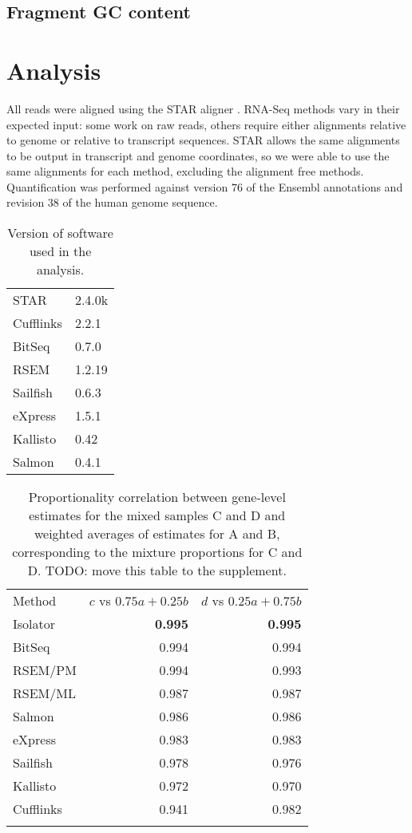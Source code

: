\documentclass{article}
\begin{document}
\subsection{Fragment GC content}\label{fragment-gc-content}

\section{Analysis}

All reads were aligned using the STAR aligner \cite{Dobin:2013fg}. RNA-Seq
methods vary in their expected input: some work on raw reads, others require
either alignments relative to genome or relative to transcript sequences. STAR
allows the same alignments to be output in transcript and genome coordinates, so
we were able to use the same alignments for each method, excluding the alignment
free methods. Quantification was performed against version 76 of the Ensembl
annotations and revision 38 of the human genome sequence.

\begin{table}
\begin{tabular}[c]{ll}
    STAR & 2.4.0k \\
    Cufflinks & 2.2.1 \\
    BitSeq & 0.7.0 \\
    RSEM & 1.2.19 \\
    Sailfish & 0.6.3 \\
    eXpress & 1.5.1 \\
    Kallisto & 0.42 \\
    Salmon & 0.4.1
\end{tabular}
\caption{
    Version of software used in the analysis.
}
\end{table}

\begin{table}\begin{tabular}[c]{@{}lrr@{}}
\toprule\addlinespace
Method & $c$ vs $0.75a + 0.25b$ & $d$ vs $0.25a + 0.75b$
\\\addlinespace
\midrule
Isolator & \textbf{0.995} & \textbf{0.995}
\\\addlinespace
BitSeq & 0.994 & 0.994
\\\addlinespace
RSEM/PM & 0.994 & 0.993
\\\addlinespace
RSEM/ML & 0.987 & 0.987
\\\addlinespace
Salmon & 0.986 & 0.986
\\\addlinespace
eXpress & 0.983 & 0.983
\\\addlinespace
Sailfish & 0.978 & 0.976
\\\addlinespace
Kallisto & 0.972 & 0.970
\\\addlinespace
Cufflinks & 0.941 & 0.982
\\\addlinespace
\bottomrule
\addlinespace
\end{tabular}
\caption{Proportionality correlation between gene-level estimates for
the mixed samples C and D and weighted averages of estimates for A and
B, corresponding to the mixture proportions for C and D. TODO: move this
table to the supplement.}
\label{table:seqcgenes}
\end{table}
\end{document}
